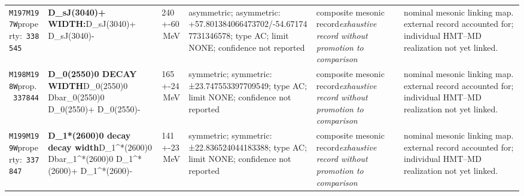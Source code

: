 \begin{landscape}
\begin{longtable}{L{1.85cm}L{4.45cm}L{2.35cm}L{4.05cm}L{3.35cm}L{7.15cm}}
\texttt{M197}\newline \texttt{M197W}\newline property:\ \texttt{338545} & \textbf{D\_\allowbreak{}sJ(3040)+ WIDTH:}\newline D\_\allowbreak{}sJ(3040)+ \textbar{}\allowbreak{} D\_\allowbreak{}sJ(3040)- & 240+-60\,MeV & asymmetric; asymmetric: +57.801384066473702/-54.671747731346578; type AC; limit NONE; confidence not reported & composite mesonic record\newline \emph{exhaustive record without promotion to comparison} & nominal mesonic linking map. external record accounted for; individual HMT--MD realization not yet linked. \\
\texttt{M198}\newline \texttt{M198W}\newline prop.\ \texttt{337844} & \textbf{D\_\allowbreak{}0(2550)0 DECAY WIDTH}\newline D\_\allowbreak{}0(2550)0 \textbar{}\allowbreak{} Dbar\_\allowbreak{}0(2550)0 \textbar{}\allowbreak{} D\_\allowbreak{}0(2550)+ \textbar{}\allowbreak{} D\_\allowbreak{}0(2550)- & 165+-24\,MeV & symmetric; symmetric: ±23.747553397709549; type AC; limit NONE; confidence not reported & composite mesonic record\newline \emph{exhaustive record without promotion to comparison} & nominal mesonic linking map. external record accounted for; individual HMT--MD realization not yet linked. \\
\texttt{M199}\newline \texttt{M199W}\newline property:\ \texttt{337847} & \textbf{D\_\allowbreak{}1*(2600)0 decay decay width}\newline D\_\allowbreak{}1\textasciicircum{}*(2600)0 \textbar{}\allowbreak{} Dbar\_\allowbreak{}1\textasciicircum{}*(2600)0 \textbar{}\allowbreak{} D\_\allowbreak{}1\textasciicircum{}*(2600)+ \textbar{}\allowbreak{} D\_\allowbreak{}1\textasciicircum{}*(2600)- & 141+-23\,MeV & symmetric; symmetric: ±22.836524044183388; type AC; limit NONE; confidence not reported & composite mesonic record\newline \emph{exhaustive record without promotion to comparison} & nominal mesonic linking map. external record accounted for; individual HMT--MD realization not yet linked. \\

\end{longtable}
\end{landscape}
